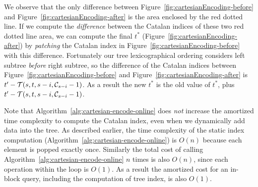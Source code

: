 We observe that the only difference between
Figure~\ref{fig:cartesianEncoding-before} and
Figure~\ref{fig:cartesianEncoding-after} is the area enclosed by the red
dotted line.  If we compute the {\em difference} between the Catalan
indices of these two red dotted line area, we can compute the final
$t^*$ (Figure~\ref{fig:cartesianEncoding-after}) by {\em patching} the
Catalan index in Figure~\ref{fig:cartesianEncoding-before} with this
difference. Fortunately our tree lexicographical ordering considers left
subtree {\em before} right subtree, so the difference of the Catalan
indices between Figure~\ref{fig:cartesianEncoding-before} and
Figure~\ref{fig:cartesianEncoding-after} is $t' - {\cal T}(s, t, s - i,
{\cal C}_{s-i} - 1)$.  As a result the new $t^*$ is the old value of
$t^*$, plus $t' - {\cal T}(s, t, s - i, {\cal C}_{s-i} - 1)$.

Note that Algorithm~\ref{alg:cartesian-encode-online} does {\em not}
increase the amortized time complexity to compute the Catalan index,
even when we dynamically add data into the tree.  As described
earlier, the time complexity of the static index computation
(Algorithm~\ref{alg:cartesian-encode-online}) is $O(n)$ because each
element is popped exactly once.  Similarly the total cost of calling
Algorithm~\ref{alg:cartesian-encode-online} $n$ times is also $O(n)$,
since each operation within the loop is $O(1)$.  As a result the
amortized cost for an in-block query, including the computation of
tree index, is also $O(1)$.